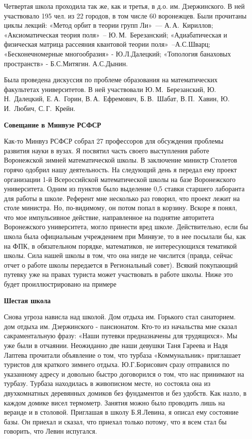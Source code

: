 Четвертая школа проходила так же, как и третья, в д.о. им. Дзержинского.
В ней участвовало 195 чел. из 22 городов, в том числе 60 воронежцев.
Были прочитаны циклы лекций:
«Метод орбит в теории групп Ли»~--- А.\,А.~Кириллов;
«Аксиоматическая теория поля»~-- Ю.\,М.~Березанский;
«Адиабатическая и физическая матрица рассеяния квантовой теории поля»~--А.С.Шварц;
«Бесконечномерные многообразия» - Ю.Л.Далецкий;
«Топология банаховых пространств» - Б.С.Митягин. А.С.Дынин.

Была проведена дискуссия по проблеме образования на математических факультетах университетов.
В ней участвовали Ю.\,М.~Березанский, Ю.\,Н.~Далецкий,
Е.\,А.~Горин, В.\,А.~Ефремович, Б.\,В.~Шабат, В.\,П.~Хавин, Ю.\,И.~Любич, С.\,Г.~Крейн.

{\bf Совещание в Минвузе РСФСР}

Как-то Минвуз РСФСР собрал 27 профессоров для обсуждения проблемы развития науки в вузах. Я посвятил часть своего выступления работе Воронежской зимней математической школы. В заключение министр Столетов горячо одобрил нашу деятельность. На следующий день я передал ему проект организации 1-й Всероссийской математической школы на базе Воронежского университета. Одним из пунктов было выделение 0,5 ставки старшего лаборанта для работы в школе. Референт мне несколько раз говорил, что проект лежит на столе министра. Но, по-видимому, он потом попал в корзину. Вскоре я понял, что мое импульсивное действие, направленное на поднятие авторитета Воронежского университета, могло принести вред школе. Действительно, если бы школа была официальным учреждением при Минвузе, то в нее посылали бы, как на ФПК, в обязательном порядке, математиков, не интересующихся тематикой школы. Сила нашей школы в том, что она нигде не числится (правда, сейчас отчет о работе школы передается в Региональный совет). Всякий покупающий путевку уже на правах туриста может участвовать в работе школы. Ниже это будет проиллюстрировано на примере

{\bf Шестая школа}

Снова угроза нависла над школой. Дом отдыха им. Горького стал санаторием. дом отдыха им. Дзержинского - пансионатом. Кто-то из начальства мне сказал сакраментальную фразу: «Наши путевки предназначены для трудящихся». Мы уже были в отчаянии. Неожиданно две наши девушки Таня Гареева и Надя Лаптева прочитали объявление о том, что турбаза «Коммунальник» приглашает туристов для краткого зимнего отдыха. Ю.Г.Борисович сразу отправился по указанному адресу и довольно быстро договорился о том, что нас принимают на турбазу. Турбаза находилась в живописном месте, но состояла она из двухкомнатных деревянных домиков без фундаментов и без удобств. Как назло, в каждом домике висел термометр. Занятия можно было проводить лишь на веранде и в столовой. Приглашая в школу Б.Я.Левина, я описал ему состояние базы. Он приехал и сказал, что приехал только потому, что я всем стал бы говорить, что Левин испугался.

